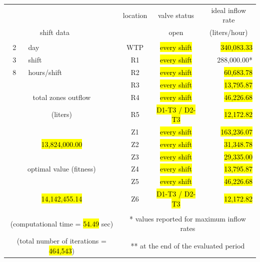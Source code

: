 \documentclass{singlecol}
\theoremstyle{TH}{
\newtheorem{lemma}{Lemma}
\newtheorem{theorem}[lemma]{Theorem}
\newtheorem{corrolary}[lemma]{Corrolary}
\newtheorem{conjecture}[lemma]{Conjecture}
\newtheorem{proposition}[lemma]{Proposition}
\newtheorem{claim}[lemma]{Claim}
\newtheorem{stheorem}[lemma]{Wrong Theorem}
\newtheorem{algorithm}{Algorithm}
}
\theoremstyle{THrm}{
\newtheorem{definition}{Definition}[section]
\newtheorem{question}{Question}[section]
\newtheorem{remark}{Remark}
\newtheorem{scheme}{Scheme}
}
\theoremstyle{THhit}{
\newtheorem{case}{Case}[section]
}
\begin{document}
\begin{table}[t]
\begin{center}
\begin{small}
\begin{tabular}{ c r r r r r }
		   \\
		&  &      &  \multicolumn{1}{c}{location}    & \multicolumn{1}{c}{valve status}         & \multicolumn{1}{c}{ideal inflow rate}   \\
		\multicolumn{2}{c}{shift data}     &   &      & \multicolumn{1}{c}{open}        & \multicolumn{1}{c}{(liters/hour)}  \\
		   \\
		2   &  \multicolumn{1}{l}{day}   &              	& \multicolumn{1}{c}{WTP}    & \multicolumn{1}{c}{\hl{every shift}} &  \hl{340,083.33} \\
		3   &  \multicolumn{1}{l}{shift}  &         		& \multicolumn{1}{c}{R1}     & \multicolumn{1}{c}{\hl{every shift}} &  288,000.00*  \\
		8   &  \multicolumn{1}{l}{hours/shift}        &     & \multicolumn{1}{c}{R2}     & \multicolumn{1}{c}{\hl{every shift}} &   \hl{60,683.78}  \\
	   &      &              								& \multicolumn{1}{c}{R3}     & \multicolumn{1}{c}{\hl{every shift}} &   \hl{13,795.87}  \\
	   \multicolumn{3}{c}{total zones outflow}              & \multicolumn{1}{c}{R4}     & \multicolumn{1}{c}{\hl{every shift}} &   \hl{46,226.68}  \\
	   \multicolumn{3}{c}{(liters)}              		    & \multicolumn{1}{c}{R5}     & \multicolumn{1}{c}{\hl{D1-T3 / D2-T3}} &    \hl{12,172.82} \\
	   &      &              								& \multicolumn{1}{c}{Z1}     & \multicolumn{1}{c}{\hl{every shift}} &  \hl{163,236.07}  \\
	   \multicolumn{3}{c}{\hl{13,824,000.00}}              		& \multicolumn{1}{c}{Z2}     & \multicolumn{1}{c}{\hl{every shift}} &   \hl{31,348.78}  \\
	      &              &              					& \multicolumn{1}{c}{Z3}     & \multicolumn{1}{c}{\hl{every shift}} &   \hl{29,335.00}  \\
	   \multicolumn{3}{c}{optimal value (fitness)}          & \multicolumn{1}{c}{Z4}     & \multicolumn{1}{c}{\hl{every shift}} &   \hl{13,795.87}  \\
	   &             &             						    & \multicolumn{1}{c}{Z5}     & \multicolumn{1}{c}{\hl{every shift}} &   \hl{46,226.68}  \\
	   \multicolumn{3}{c}{\hl{14,142,455.14} }             		& \multicolumn{1}{c}{Z6}     & \multicolumn{1}{c}{\hl{D1-T3 / D2-T3}} &    \hl{12,172.82}  \\
	   \\
	   \multicolumn{3}{c}{(computational time = \hl{54.49} sec)} & \multicolumn{3}{c}{* values reported for maximum inflow rates} \\
	   \multicolumn{3}{c}{(total number of iterations = \hl{464,543})} & \multicolumn{3}{c}{** at the end of the evaluated period} 


\end{tabular}
\end{small}
\end{center}
\end{table}
\end{document}
